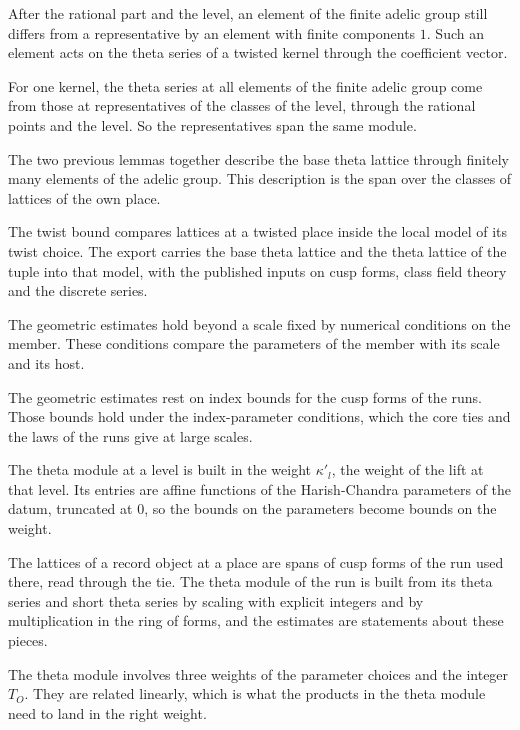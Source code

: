 After the rational part and the level, an element of the finite adelic group still differs from a
representative by an element with finite components $1$. Such an element acts on the theta series of a
twisted kernel through the coefficient vector.

For one kernel, the theta series at all elements of the finite adelic group come from those at
representatives of the classes of the level, through the rational points and the level. So the
representatives span the same module.

The two previous lemmas together describe the base theta lattice through finitely many elements of
the adelic group. This description is the span over the classes of lattices of the own place.

The twist bound compares lattices at a twisted place inside the local model of its twist choice.
The export carries the base theta lattice and the theta lattice of the tuple into that model, with
the published inputs on cusp forms, class field theory and the discrete series.

The geometric estimates hold beyond a scale fixed by numerical conditions on the member. These
conditions compare the parameters of the member with its scale and its host.

The geometric estimates rest on index bounds for the cusp forms of the runs. Those bounds hold under
the index-parameter conditions, which the core ties and the laws of the runs give at large scales.

The theta module at a level is built in the weight $\kappa'_l$, the weight of the lift at that level.
Its entries are affine functions of the Harish-Chandra parameters of the datum, truncated at $0$, so
the bounds on the parameters become bounds on the weight.

The lattices of a record object at a place are spans of cusp forms of the run used there, read
through the tie. The theta module of the run is built from its theta series and short theta series
by scaling with explicit integers and by multiplication in the ring of forms, and the estimates are
statements about these pieces.

The theta module involves three weights of the parameter choices and the integer $T_O$. They are
related linearly, which is what the products in the theta module need to land in the right weight.

